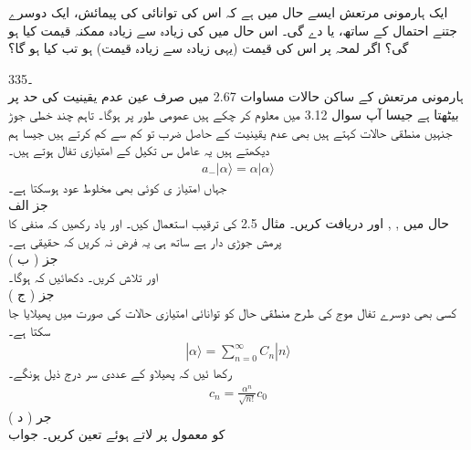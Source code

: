 ایک ہارمونی مرتعش ایسے حال میں ہے کہ اس کی توانائی کی  پیمائش،  ایک دوسرے جتنے  احتمال کے ساتھ،   یا  دے گی۔ اس حال میں    کی زیادہ سے زیادہ ممکنہ قیمت کیا  ہو گی؟  اگر لمحہ   پر اس کی     قیمت (یہی زیادہ سے زیادہ  قیمت)  ہو تب   کیا ہو گا؟


3۔35\\
 \quad
ہارمونی مرتعش کے ساکن حالات 
مساوات 2.67 میں صرف
عین عدم یقینیت کی حد
پر بیٹھتا ہے جیسا آپ سوال 3.12 میں معلوم کر چکے ہیں عمومی طور پر
ہوگا۔ تاہم چند خطی جوڑ جنہیں منطقی حالات کہتے ہیں بھی عدم یقینیت کے حاصل ضرب تو کم سے کم کرتے ہیں جیسا ہم دیکھتے ہیں یہ عامل س تکیل کے امتیازی تفال ہوتے ہیں۔\\
\begin{align}a_{-}|\alpha\rangle =\alpha|\alpha\rangle\end{align}
جہاں امتیاز ی 
کوئی بھی مخلوط عود ہوسکتا ہے۔\\
جز الف\\
حال 
میں
,
,
اور
دریافت کریں۔ مثال 2.5 کی ترقیب استعمال کیں۔ اور یاد رکھیں کہ
منفی کا پرمش جوڑی دار
ہے ساتھ ہی یہ فرض نہ کریں کہ
حقیقی ہے۔\\
جز ( ب )\\
اور
تلاش کریں۔ دکھائیں کہ
ہوگا۔\\
جز ( ج )\\
کسی بھی دوسرے تفال موج کی طرح منطقی حال کو توانائی امتیازی حالات کی صورت میں پھیلایا جا سکتا ہے۔\\
\begin{align}|\alpha\rangle=\sum_{n=0}^{\infty}C_{n}|n\rangle\end{align}
رکھا ئیں کہ پھیلاو کے عددی سر درج ذیل ہونگے۔\\
\begin{align}c_{n}=\frac{\alpha^{n}}{\sqrt{n!}}c_{0}\end{align}
جر ( د )\\
کو معمول پر لاتے ہوئے
تعین کریں۔
جواب
\\
